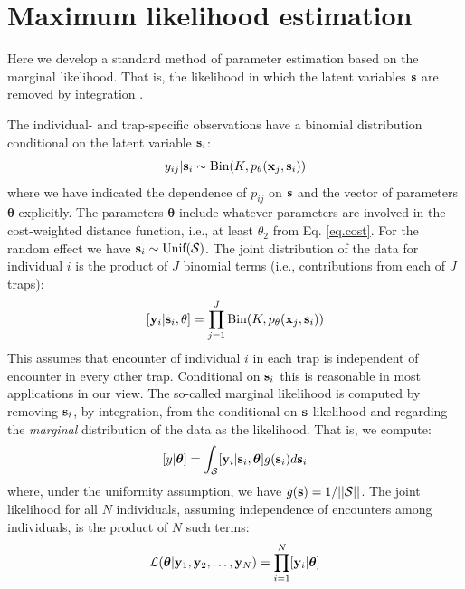 \documentclass[12pt]{article}
\begin{document}
\section{Maximum likelihood estimation}
\label{sec.mle}

Here we develop a standard method of parameter estimation based on
the marginal likelihood. That is, the likelihood in which the latent
variables ${\bf s}$ are removed by integration \citep{borchers_efford:2008}.

The individual- and trap-specific observations have a binomial
distribution conditional on the latent variable ${\bf s}_{i}$:
\begin{equation}
	y_{ij}| {\bf s}_{i} \sim \mbox{Bin}(K, p_{\theta}({\bf x}_{j},{\bf s}_{i}))
\label{mle.eq.cond-on-s}
\end{equation}
where we have indicated the dependence of $p_{ij}$ on ${\bf s}$ and
the vector of parameters ${\bm \theta}$ explicitly. The parameters
${\bm \theta}$ include whatever parameters are involved in the
cost-weighted distance function, i.e., at least $\theta_{2}$ from
Eq. \ref{eq.cost}.
For the random effect we have ${\bf s}_{i} \sim  \mbox{Unif}({\cal
  S})$.
The joint distribution of the data for individual $i$ is the product
of $J$ binomial terms (i.e., contributions from each of $J$ traps):
\[
  [{\bf y}_{i} | {\bf s}_{i} , \theta] =
  \prod_{j=1}^{J} \mbox{Bin}(K, p_{\theta}({\bf x}_{j},{\bf s}_{i}) )
\]
This assumes that encounter of individual $i$ in each
trap is independent of encounter in every other trap. Conditional on
${\bf s}_{i}$ this is reasonable in most applications in our view.
 The so-called marginal likelihood is computed by removing
${\bf s}_{i}$, by integration,  from the conditional-on-${\bf s}$
likelihood and regarding the {\it marginal} distribution of the data
as the likelihood. That
is, we compute:
\[
  [y|{\bm \theta}] =
\int_{{\cal S}}  [ {\bf y}_{i} |{\bf s}_{i},{\bm \theta}] g({\bf s}_{i}) d{\bf s}_{i}
\]
where, under the uniformity assumption, we have
$g({\bf s}) = 1/||{\cal S}||$.
The joint likelihood for all $N$ individuals, assuming independence of
encounters among individuals, is the product of $N$ such terms:
\[
{\cal L}({\bm \theta} | {\bf y}_{1},{\bf y}_{2},\ldots, {\bf y}_{N}) = \prod_{i=1}^{N}
[{\bf y}_{i}|{\bm \theta}]
\]
\end{document}
